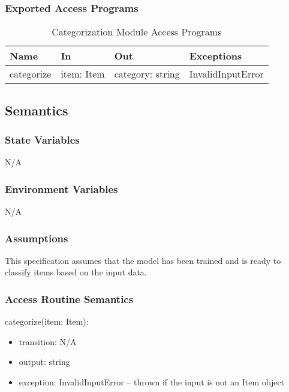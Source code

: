 \documentclass[12pt, titlepage]{article}
\begin{document}
\subsubsection{Exported Access Programs}

\begin{center}
  \begin{table}[H]
    \caption{Categorization Module Access Programs}
\begin{tabular}{p{4cm} p{4cm} p{4cm} p{4cm}}
\hline
\textbf{Name} & \textbf{In} & \textbf{Out} & \textbf{Exceptions} \\
\hline
categorize & item: Item & category: string & InvalidInputError \\
\hline
\end{tabular}
\end{table}
\end{center}

\subsection{Semantics}

\subsubsection{State Variables}
N/A

\subsubsection{Environment Variables}
N/A

\subsubsection{Assumptions}
This specification assumes that the model has been trained and is ready to
classify items based on the input data.

\subsubsection{Access Routine Semantics}

\noindent categorize(item: Item):
\begin{itemize}
\item transition: N/A 
\item output: string 
\item exception: InvalidInputError -- thrown if the input is not an Item object
\end{itemize}
\end{document}
